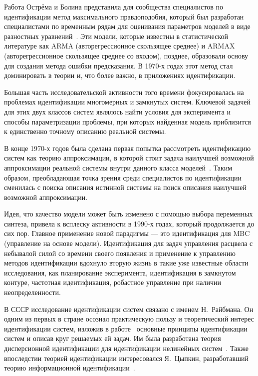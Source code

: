 Работа Острёма и Болина представила для сообщества специалистов по идентификации метод
максимального правдоподобия, который был разработан специалистами по временным рядам для
оценивания параметров моделей в виде разностных уравнений~\cite{koopmans_1950}.
Эти модели, которые известны в статистической литературе как ARMA (авторегрессионное скользящее среднее) и
ARMAX (авторегрессионное скользящее среднее со входом), позднее,
образовали основу для создания метода ошибки предсказания.
В 1970-х годах этот метод стал доминировать в теории и, что более важно, в приложениях идентификации.

Большая часть исследовательской активности того времени фокусировалась на проблемах идентификации
многомерных и замкнутых систем.
Ключевой задачей для этих двух классов систем являлось найти условия для эксперимента и
способы параметризации проблемы, при которых найденная модель приблизится к единственно точному
описанию реальной системы.

В конце 1970-х годов была сделана первая попытка рассмотреть идентификацию систем как
теорию аппроксимации, в которой стоит задача наилучшей возможной аппроксимации реальной системы
внутри данного класса моделей~\cite{ljung_1976, anderson_1978, ljung_1979}.
Таким образом, преобладающая точка зрения среди специалистов по идентификации сменилась с
поиска описания истинной системы на поиск описания наилучшей возможной аппроксимации.

Идея, что качество модели может быть изменено с помощью выбора переменных синтеза,
привела к всплеску активности в 1990-х годах, который продолжается до сих пор.
Главное применение новой парадигмы --- это идентификация для MBC (управление на основе модели).
Идентификация для задач управления расцвела с небывалой силой со времени своего появления и
применение к управлению методов идентификации вдохнуло вторую жизнь в такие уже
известные области исследования, как планирование эксперимента, идентификация в замкнутом контуре,
частотная идентификация, робастное управление при наличии неопределенности.

В СССР исследование идентификации систем связано с именем Н.~Райбмана.
Он одним из первых в стране осознал практическую пользу и теоретический интерес идентификации систем,
изложив в работе~\cite{raibman_1970} основные принципы идентификации систем и описав круг
решаемых ей задач.
Им была разработана теория дисперсионной идентификации для идентификации
нелинейных систем~\cite{raibman_1981}.
Также впоследстии теорией идентификации интересовался Я.~Цыпкин,
разработавший теорию информационной идентификации~\cite{tsypkin_1995}.

